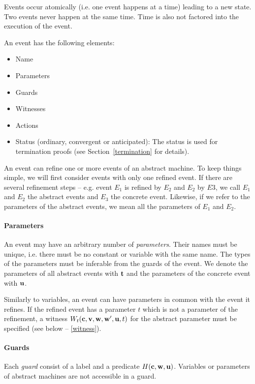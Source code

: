 Events occur atomically (i.e. one event happens at a time) leading to a new state.
Two events never happen at the same time. Time is also not factored into the execution of the event.

An event has the following elements:
\begin{itemize}
\item Name
\item Parameters
\item Guards
\item Witnesses
\item Actions
\item Status (ordinary, convergent or anticipated): The status is used
  for termination proofs (see Section~\ref{termination} for details).
\end{itemize}

An event can refine one or more events of an abstract machine. To keep things simple, we will
  first consider events with only one refined event.
If there are several refinement steps -- e.g. event $E_1$ is refined by $E_2$ and $E_2$ by
  $E3$, we call $E_1$ and $E_2$ the abstract events and $E_3$ the concrete event.
Likewise, if we refer to the parameters of the abstract events, we mean all the parameters
  of $E_1$ and $E_2$.

\paragraph{Parameters}
\label{parameters}
An event may have an arbitrary number of \emph{parameters}. Their names must be unique, i.e. there must be no constant or variable with the same name.
The types of the parameters must be inferable from the guards of the event.
We denote the parameters of all abstract events with $\mathbf{t}$ and the
parameters of the concrete event with $\mathbf{u}$.

Similarly to variables, an event can have parameters in common with the event it refines.
If the refined event has a parameter $t$ which is not a parameter of the refinement, 
 a witness $W_t(\mathbf{c},{\mathbf{v},\mathbf{w}},\mathbf{w}',\mathbf{u},t)$ for
 the abstract parameter must be specified (see below -- \ref{witness}).

\paragraph{Guards}
\label{guards}
Each \emph{guard} consist of a label and a predicate $H(\mathbf{c},\mathbf{w},\mathbf{u})$.
Variables or parameters of abstract machines are not accessible in a guard.

